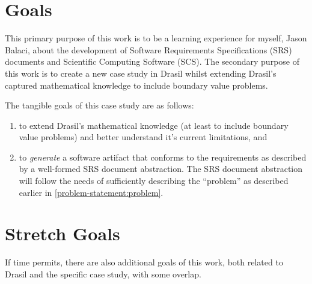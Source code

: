 \documentclass{article}
\begin{document}
\section{Goals}
\label{goals}

This primary purpose of this work is to be a learning experience for myself,
Jason Balaci, about the development of Software Requirements Specifications
(SRS) documents and Scientific Computing Software (SCS). The secondary purpose
of this work is to create a new case study in Drasil whilst extending Drasil's
captured mathematical knowledge to include boundary value problems.

The tangible goals of this case study are as follows:

\begin{enumerate}
    \item to extend Drasil's mathematical knowledge (at least to include
          boundary value problems) and better understand it's current
          limitations, and
    \item to \textit{generate} a software artifact that conforms to the
          requirements as described by a well-formed SRS document abstraction.
          The SRS document abstraction will follow the needs of sufficiently
          describing the ``problem'' as described earlier in
          \autoref{problem-statement:problem}.
\end{enumerate}

\section{Stretch Goals}
\label{stretch-goals}

If time permits, there are also additional goals of this work, both related to
Drasil and the specific case study, with some overlap.
\end{document}
